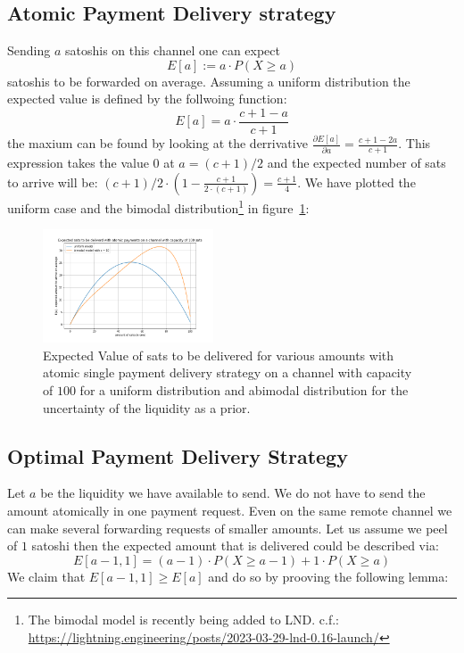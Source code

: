 \documentclass[10pt,twocolumn]{article}
\begin{document}
\subsection{Atomic Payment Delivery strategy}

Sending $a$ satoshis on this channel one can expect
\[
E[a] := a\cdot P(X\geq a)
\]
satoshis to be forwarded on average.
Assuming a uniform distribution the expected value is defined by the follwoing function:
\[
E[a] = a\cdot\frac{c+1-a}{c+1}
\]
the maxium can be found by looking at the derrivative $\frac{\partial E[a]}{\partial a} = \frac{c+1 -2a}{c+1}$.
This expression takes the value $0$ at $a=(c+1)/2$ and the expected number of sats to arrive will be: $(c+1)/2 \cdot (1 - \frac{c+1}{2\cdot(c+1)}) = \frac{c+1}{4}$. We have plotted the uniform case and the bimodal distribution\footnote{The bimodal model is recently being added to LND. c.f.: \url{https://lightning.engineering/posts/2023-03-29-lnd-0.16-launch/}} in figure~\ref{fig:atomicPayment}:

\begin{figure}[htpb]
  \center
  \includegraphics[width=0.45\textwidth]{img/atomicPaymentSingleChannel}
  \caption{Expected Value of sats to be delivered for various amounts with atomic single payment delivery strategy on a channel with capacity of $100$ for a uniform distribution and abimodal distribution for the uncertainty of the liquidity as a prior.}
  \label{fig:atomicPayment}
\end{figure}

\subsection{Optimal Payment Delivery Strategy}
Let $a$ be the liquidity we have available to send.
We do not have to send the amount atomically in one payment request.
Even on the same remote channel we can make several forwarding requests of smaller amounts.
Let us assume we peel of $1$ satoshi then the expected amount that is delivered could be described via:
\[
E[a-1,1] = (a-1)\cdot P(X\geq a-1) + 1 \cdot P(X\geq a)
\]
We claim that $E[a-1,1] \geq E[a]$ and do so by prooving the following lemma:
\end{document}
